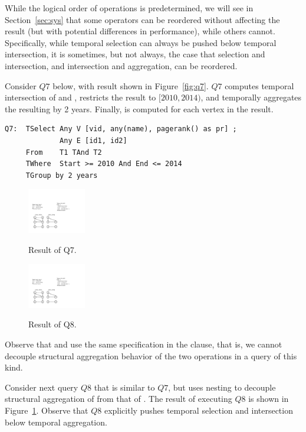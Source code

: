While the logical order of operations is predetermined, we will see in
Section~\ref{sec:sys} that some operators can be reordered without
affecting the result (but with potential differences in performance),
while others cannot.  Specifically, while temporal selection can
always be pushed below temporal intersection, it is sometimes, but not
always, the case that selection and intersection, and intersection and
aggregation, can be reordered.

Consider $Q7$ below, with result shown in Figure~\ref{fig:q7}. $Q7$
computes temporal intersection of  and , restricts
the result to $[2010, 2014)$, and temporally aggregates the resulting
  \tg by 2 years.  Finally,  is computed for each
  vertex in the result.

\begin{verbatim}
Q7:  TSelect Any V [vid, any(name), pagerank() as pr] ; 
             Any E [id1, id2] 
     From    T1 TAnd T2 
     TWhere  Start >= 2010 And End <= 2014 
     TGroup by 2 years
\end{verbatim}

\begin{figure}
\centering
\begin{minipage}{1.6in}
  \centering
  \includegraphics[width=1in]{figs/q7.pdf}
  \caption{Result of Q7.}{}
  \label{fig:q7}
\end{minipage}%
\begin{minipage}{1.6in}
  \centering
  \includegraphics[width=1in]{figs/q8.pdf}
  \caption{Result of Q8.}{}
  \label{fig:q8}
\end{minipage}
\end{figure}

Observe that  and  use the same
specification in the  clause, that is, we cannot
decouple structural aggregation behavior of the two operations in a
query of this kind.

Consider next query $Q8$ that is similar to $Q7$, but uses nesting to
decouple structural aggregation of  from that of
. The result of executing $Q8$ is shown in
Figure~\ref{fig:q8}.  Observe that $Q8$ explicitly pushes temporal
selection and intersection below temporal aggregation.


